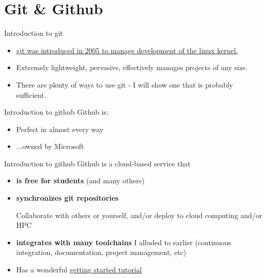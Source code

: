 \documentclass{beamer}
\begin{document}
\section{Git \& Github}
\begin{frame}{Introduction to git}
  \begin{itemize}
  \item {\color{blue} \href{https://git-scm.com/book/en/v2/Getting-Started-A-Short-History-of-Git}{git was introduced in 2005 to manage development of the linux kernel.}}

  \item Extremely lightweight, pervasive, effectively manages projects of any size.

  \item There are plenty of ways to use git - I will show one that is probably sufficient.
  \end{itemize}
\end{frame}

\begin{frame}{Introduction to github}
  Github is:
  \begin{itemize}
  \item Perfect in almost every way 
  \item ...owned by Microsoft 
  \end{itemize}
\end{frame}

\begin{frame}{Introduction to github}
  Github is a cloud-based service that
  \begin{itemize}
  \item \textbf{is free for students} (and many others)
  \item \textbf{synchronizes git repositories}

    Collaborate with others or yourself, and/or deploy to cloud computing and/or HPC
    
  \item \textbf{integrates with many toolchains} I alluded to earlier (continuous integration, documentation, project management, etc)

  \item Has a wonderful {\color{blue} \href{https://docs.github.com/en/get-started/start-your-journey}{getting started tutorial}}
  \end{itemize}
\end{frame}
\end{document}
